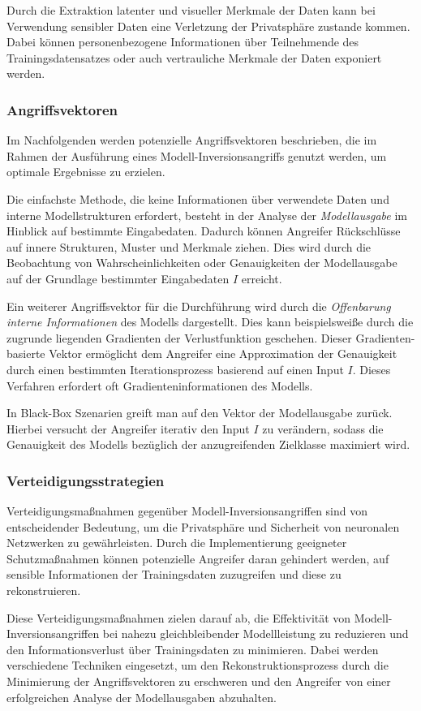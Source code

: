 Durch die Extraktion latenter und visueller Merkmale der Daten kann bei Verwendung sensibler Daten eine Verletzung der Privatsphäre zustande kommen. Dabei können personenbezogene Informationen über Teilnehmende des Trainingsdatensatzes oder auch vertrauliche Merkmale der Daten exponiert werden.
\subsubsection{Angriffsvektoren}
Im Nachfolgenden werden potenzielle Angriffsvektoren beschrieben, die im Rahmen der Ausführung eines Modell-Inversionsangriffs genutzt werden, um optimale Ergebnisse zu erzielen.

Die einfachste Methode, die keine Informationen über verwendete Daten und interne Modellstrukturen erfordert, besteht in der Analyse der \textit{Modellausgabe} im Hinblick auf bestimmte Eingabedaten. Dadurch können Angreifer Rückschlüsse auf innere Strukturen, Muster und Merkmale ziehen. Dies wird durch die Beobachtung von Wahrscheinlichkeiten oder Genauigkeiten der Modellausgabe auf der Grundlage bestimmter Eingabedaten $I$ erreicht.

Ein weiterer Angriffsvektor für die Durchführung wird durch die \textit{Offenbarung interne Informationen} des Modells dargestellt. Dies kann beispielsweiße durch die zugrunde liegenden Gradienten der Verlustfunktion geschehen. Dieser Gradienten-basierte Vektor ermöglicht dem Angreifer eine Approximation der Genauigkeit durch einen bestimmten Iterationsprozess basierend auf einen Input $I$. Dieses Verfahren erfordert oft Gradienteninformationen des Modells. 

In Black-Box Szenarien greift man auf den Vektor der Modellausgabe zurück. Hierbei versucht der Angreifer iterativ den Input $I$ zu verändern, sodass die Genauigkeit des Modells bezüglich der anzugreifenden Zielklasse maximiert wird. 
\subsubsection{Verteidigungsstrategien}{\label{diff_privacy}}
Verteidigungsmaßnahmen gegenüber Modell-Inversionsangriffen sind von entscheidender Bedeutung, um die Privatsphäre und Sicherheit von neuronalen Netzwerken zu gewährleisten. Durch die Implementierung geeigneter Schutzmaßnahmen können potenzielle Angreifer daran gehindert werden, auf sensible Informationen der Trainingsdaten zuzugreifen und diese zu rekonstruieren.

Diese Verteidigungsmaßnahmen zielen darauf ab, die Effektivität von Modell-Inversionsangriffen bei nahezu gleichbleibender Modellleistung zu reduzieren und den Informationsverlust über Trainingsdaten zu minimieren. Dabei werden verschiedene Techniken eingesetzt, um den Rekonstruktionsprozess durch die Minimierung der Angriffsvektoren zu erschweren und den Angreifer von einer erfolgreichen Analyse der Modellausgaben abzuhalten.

